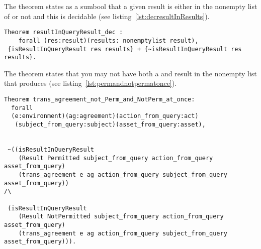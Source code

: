 The theorem  states as a sumbool that a given result is either in the nonempty list of  or not and this is decidable (see listing~\ref{lst:decresultInResults}).

\begin{lstlisting}
Theorem resultInQueryResult_dec :
    forall (res:result)(results: nonemptylist result), 
 {isResultInQueryResult res results} + {~isResultInQueryResult res results}.
\end{lstlisting}

The theorem  states that you may not have both a  and  result in the nonempty list that  produces (see listing~\ref{lst:permandnotpermatonce}).

\begin{lstlisting}
Theorem trans_agreement_not_Perm_and_NotPerm_at_once:
  forall
  (e:environment)(ag:agreement)(action_from_query:act)
   (subject_from_query:subject)(asset_from_query:asset),


 ~((isResultInQueryResult 
    (Result Permitted subject_from_query action_from_query asset_from_query)
    (trans_agreement e ag action_from_query subject_from_query asset_from_query)) 
/\

 (isResultInQueryResult 
    (Result NotPermitted subject_from_query action_from_query asset_from_query)
    (trans_agreement e ag action_from_query subject_from_query asset_from_query))).

\end{lstlisting}

